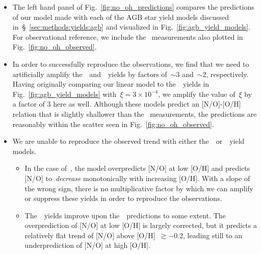 \documentclass[ms.tex]{subfiles}
\begin{document}
\begin{itemize} 
	\item The left hand panel of Fig.~\ref{fig:no_oh_predictions} compares the 
	predictions of our model made with each of the AGB star yield models 
	discussed in~\S~\ref{sec:methods:yields:agb} and visualized in 
	Fig.~\ref{fig:agb_yield_models}. 
	For observational reference, we include the~\citet{Dopita2016} measurements 
	also plotted in Fig.~\ref{fig:no_oh_observed}. 

	\item In order to successfully reproduce the observations, we find that we 
	need to artificially amplify the~\cristallo~and~\ventura~yields by factors 
	of~$\sim$3 and~$\sim$2, respectively. 
	Having originally comparing our linear model to the~\cristallo~yields in 
	Fig.~\ref{fig:agb_yield_models} with~$\xi = 3\times10^{-4}$, we amplify the 
	value of~$\xi$ by a factor of 3 here as well. 
	Although these models predict an [N/O]-[O/H] relation that is slightly 
	shallower than the~\citet{Dopita2016} measurements, the predictions are 
	reasonably within the scatter seen in Fig.~\ref{fig:no_oh_observed}. 

	\item We are unable to reproduce the observed trend with either 
	the~\karakasten~or~\karakas~yield models. 
	\begin{itemize} 
		\item In the case of~\karakasten, the model overpredicts [N/O] at low 
		[O/H] and predicts [N/O] to~\textit{decrease} monotonically with 
		increasing [O/H]. 
		With a slope of the wrong sign, there is no multiplicative factor by 
		which we can amplify or suppress these yields in order to reproduce the 
		observations. 

		\item The~\karakas~yields improve upon the~\karakasten~predictions to 
		some extent. 
		The overprediction of [N/O] at low [O/H] is largely corrected, but it 
		predicts a relatively flat trend of [N/O] above [O/H]~$\gtrsim -0.2$, 
		leading still to an underprediction of [N/O] at high [O/H]. 
	\end{itemize} 


\end{itemize}
\end{document}
